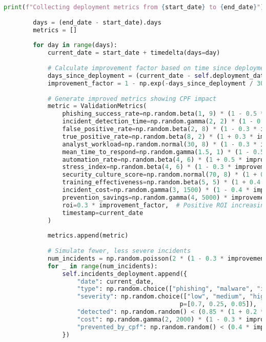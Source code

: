 \documentclass[11pt,a4paper]{article}
\begin{document}
\begin{lstlisting}[language=Python, caption=CPF Validation Framework]
        print(f"Collecting deployment metrics from {start_date} to {end_date}")
        
        days = (end_date - start_date).days
        metrics = []
        
        for day in range(days):
            current_date = start_date + timedelta(days=day)
            
            # Calculate improvement factor based on time since deployment
            days_since_deployment = (current_date - self.deployment_date).days
            improvement_factor = 1 - np.exp(-days_since_deployment / 30)  # Learning curve
            
            # Generate improved metrics showing CPF impact
            metric = ValidationMetrics(
                phishing_success_rate=np.random.beta(1, 9) * (1 - 0.5 * improvement_factor),
                incident_detection_time=np.random.gamma(2, 2) * (1 - 0.4 * improvement_factor),
                false_positive_rate=np.random.beta(2, 8) * (1 - 0.3 * improvement_factor),
                true_positive_rate=np.random.beta(8, 2) * (1 + 0.3 * improvement_factor),
                analyst_workload=np.random.normal(30, 8) * (1 - 0.3 * improvement_factor),
                mean_time_to_respond=np.random.gamma(1.5, 1) * (1 - 0.5 * improvement_factor),
                automation_rate=np.random.beta(4, 6) * (1 + 0.5 * improvement_factor),
                stress_index=np.random.beta(4, 6) * (1 - 0.3 * improvement_factor),
                security_culture_score=np.random.normal(70, 8) * (1 + 0.2 * improvement_factor),
                training_effectiveness=np.random.beta(5, 5) * (1 + 0.4 * improvement_factor),
                incident_cost=np.random.gamma(3, 1500) * (1 - 0.4 * improvement_factor),
                prevention_savings=np.random.gamma(4, 5000) * improvement_factor,
                roi=0.3 * improvement_factor,  # Positive ROI increasing over time
                timestamp=current_date
            )
            
            metrics.append(metric)
            
            # Simulate fewer, less severe incidents
            num_incidents = np.random.poisson(2 * (1 - 0.3 * improvement_factor))
            for _ in range(num_incidents):
                self.incidents_deployment.append({
                    "date": current_date,
                    "type": np.random.choice(["phishing", "malware", "insider", "other"]),
                    "severity": np.random.choice(["low", "medium", "high"], 
                                                p=[0.7, 0.25, 0.05]),  # Fewer high severity
                    "detected": np.random.random() < (0.85 * (1 + 0.2 * improvement_factor)),
                    "cost": np.random.gamma(2, 2000) * (1 - 0.3 * improvement_factor),
                    "prevented_by_cpf": np.random.random() < (0.4 * improvement_factor)
                })
        

\end{lstlisting}
\end{document}
